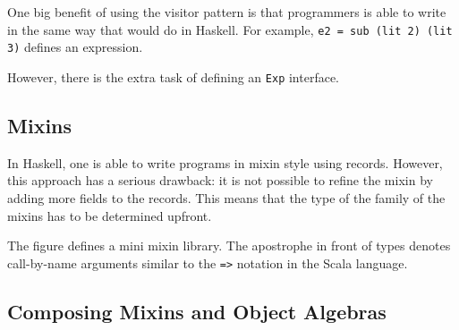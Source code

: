 One big benefit of using the visitor pattern is that programmers is able to
write in the same way that would do in Haskell. For example,
\lstinline{e2 = sub (lit 2) (lit 3)}
defines an expression.

However, there is the extra task of defining an \lstinline{Exp} interface.



\subsection{Mixins}



In Haskell, one is able to write programs in mixin style using records. However,
this approach has a serious drawback: it is not possible to refine the mixin by
adding more fields to the records. This means that the type of the family of the
mixins has to be determined upfront.

The figure defines a mini mixin library. The apostrophe in front of types
denotes call-by-name arguments similar to the \lstinline{=>} notation in the
Scala language.

\subsection{Composing Mixins and Object Algebras}

